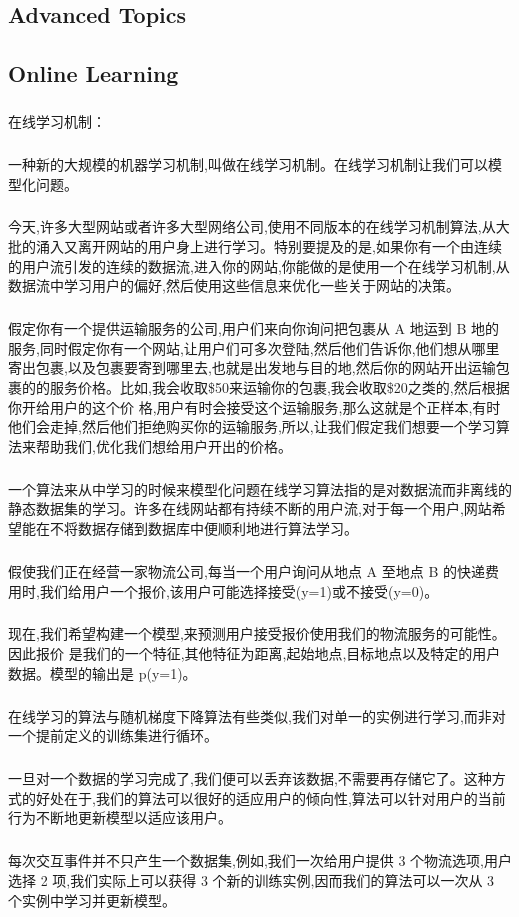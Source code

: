 \documentclass{article}
\begin{document}
\begin{CJK}{UTF8}{gbsn}
\section{Advanced Topics}
\subsection{Online Learning}
\subparagraph{}
在线学习机制：
\subparagraph{}
一种新的大规模的机器学习机制,叫做在线学习机制。在线学习机制让我们可以模型化问题。
\subparagraph{}
今天,许多大型网站或者许多大型网络公司,使用不同版本的在线学习机制算法,从大批的涌入又离开网站的用户身上进行学习。特别要提及的是,如果你有一个由连续的用户流引发的连续的数据流,进入你的网站,你能做的是使用一个在线学习机制,从数据流中学习用户的偏好,然后使用这些信息来优化一些关于网站的决策。
\subparagraph{}
假定你有一个提供运输服务的公司,用户们来向你询问把包裹从 A 地运到 B 地的服务,同时假定你有一个网站,让用户们可多次登陆,然后他们告诉你,他们想从哪里寄出包裹,以及包裹要寄到哪里去,也就是出发地与目的地,然后你的网站开出运输包裹的的服务价格。比如,我会收取\${}50来运输你的包裹,我会收取\${}20之类的,然后根据你开给用户的这个价
格,用户有时会接受这个运输服务,那么这就是个正样本,有时他们会走掉,然后他们拒绝购买你的运输服务,所以,让我们假定我们想要一个学习算法来帮助我们,优化我们想给用户开出的价格。
\begin{figure}[H]
\label{fig:11120}
\end{figure}
\subparagraph{}
一个算法来从中学习的时候来模型化问题在线学习算法指的是对数据流而非离线的静态数据集的学习。许多在线网站都有持续不断的用户流,对于每一个用户,网站希望能在不将数据存储到数据库中便顺利地进行算法学习。
\subparagraph{}
假使我们正在经营一家物流公司,每当一个用户询问从地点 A 至地点 B 的快递费用时,我们给用户一个报价,该用户可能选择接受(y=1)或不接受(y=0)。
\subparagraph{}
现在,我们希望构建一个模型,来预测用户接受报价使用我们的物流服务的可能性。因此报价 是我们的一个特征,其他特征为距离,起始地点,目标地点以及特定的用户数据。模型的输出是 p(y=1)。
\subparagraph{}
在线学习的算法与随机梯度下降算法有些类似,我们对单一的实例进行学习,而非对一个提前定义的训练集进行循环。
\subparagraph{}
一旦对一个数据的学习完成了,我们便可以丢弃该数据,不需要再存储它了。这种方式的好处在于,我们的算法可以很好的适应用户的倾向性,算法可以针对用户的当前行为不断地更新模型以适应该用户。
\subparagraph{}
每次交互事件并不只产生一个数据集,例如,我们一次给用户提供 3 个物流选项,用户选择 2 项,我们实际上可以获得 3 个新的训练实例,因而我们的算法可以一次从 3 个实例中学习并更新模型。
\begin{figure}[H]

\end{figure}
\end{CJK}
\end{document}
